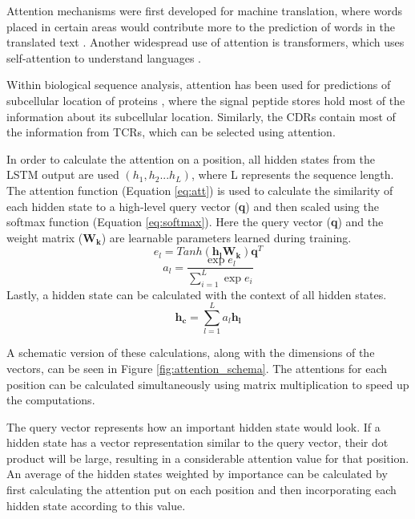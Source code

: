 Attention mechanisms were first developed for machine translation, where words placed in certain areas would contribute more to the prediction of words in the translated text \cite{Bahdanau2014NeuralTranslate}. Another widespread use of attention is transformers, which uses self-attention to understand languages \cite{Vaswani2017AttentionNeed, Devlin2019BERT:Understanding}.

Within biological sequence analysis, attention has been used for predictions of subcellular location of proteins \cite{AlmagroArmenteros2017DeepLoc:Learning}, where the signal peptide stores hold most of the information about its subcellular location. Similarly, the CDRs contain most of the information from TCRs, which can be selected using attention.

In order to calculate the attention on a position, all hidden states from the LSTM output are used $(h_1, h_2 ... h_L)$, where L represents the sequence length. The attention function (Equation \ref{eq:att}) is used to calculate the similarity of each hidden state to a high-level query vector (\textbf{q}) and then scaled using the softmax function (Equation \ref{eq:softmax}). Here the query vector (\textbf{q}) and the weight matrix ($\boldsymbol{W_k}$) are learnable parameters learned during training.
\begin{equation}
    e_l = Tanh(\boldsymbol{h_l}\boldsymbol{W_k})\boldsymbol{q}^T
    \label{eq:att}
\end{equation}
\begin{equation}
    a_l = \frac{\exp{e_l}}{\sum_{i=1}^L\exp{e_i}}
    \label{eq:softmax}
\end{equation}
Lastly, a hidden state can be calculated with the context of all hidden states.
\begin{equation}
    \boldsymbol{h_c} = \sum_{l=1}^L a_l\boldsymbol{h_l}
\end{equation}

A schematic version of these calculations, along with the dimensions of the vectors, can be seen in Figure \ref{fig:attention_schema}. The attentions for each position can be calculated simultaneously using matrix multiplication to speed up the computations.

The query vector represents how an important hidden state would look. If a hidden state has a vector representation similar to the query vector, their dot product will be large, resulting in a considerable attention value for that position. 
An average of the hidden states weighted by importance can be calculated by first calculating the attention put on each position and then incorporating each hidden state according to this value.


